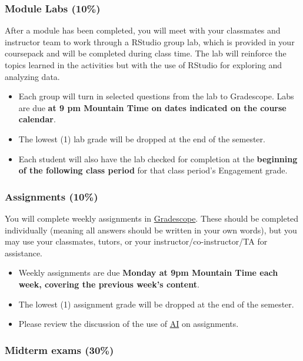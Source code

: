 \documentclass[
]{article}
\providecommand{\tightlist}{%
  \setlength{\itemsep}{0pt}\setlength{\parskip}{0pt}}
\begin{document}
\subsubsection{Module Labs (10\%)}\label{module-labs-10}

After a module has been completed, you will meet with your classmates
and instructor team to work through a RStudio group lab, which is
provided in your coursepack and will be completed during class time. The
lab will reinforce the topics learned in the activities but with the use
of RStudio for exploring and analyzing data.

\begin{itemize}
\tightlist
\item
  Each group will turn in selected questions from the lab to Gradescope.
  Labs are due \textbf{at 9 pm Mountain Time on dates indicated on the
  course calendar}.
\item
  The lowest (1) lab grade will be dropped at the end of the semester.
\item
  Each student will also have the lab checked for completion at the
  \textbf{beginning of the following class period} for that class
  period's Engagement grade.
\end{itemize}

\subsubsection{Assignments (10\%)}\label{assignments-10}

You will complete weekly assignments in
\href{https://www.gradescope.com/}{Gradescope}. These should be
completed individually (meaning all answers should be written in your
own words), but you may use your classmates, tutors, or your
instructor/co-instructor/TA for assistance.

\begin{itemize}
\tightlist
\item
  Weekly assignments are due \textbf{Monday at 9pm Mountain Time each
  week, covering the previous week's content}.
\item
  The lowest (1) assignment grade will be dropped at the end of the
  semester.
\item
  Please review the discussion of the use of \hyperref[AI]{AI} on
  assignments.
\end{itemize}

\subsubsection{Midterm exams (30\%)}\label{midterm-exams-30}
\end{document}
